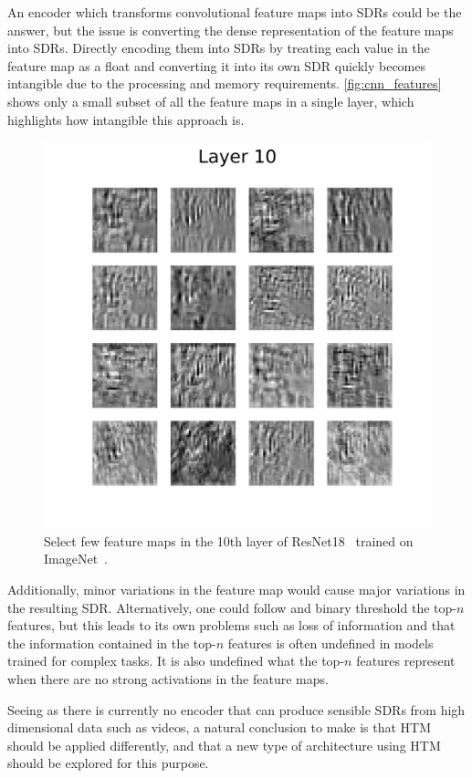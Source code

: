 \par
An encoder which transforms convolutional feature maps into SDRs could be the answer, but the issue is converting the dense representation of the feature maps into SDRs. Directly encoding them into SDRs by treating each value in the feature map as a float and converting it into its own SDR quickly becomes intangible due to the processing and memory requirements. \autoref{fig:cnn_features} shows only a small subset of all the feature maps in a single layer, which highlights how intangible this approach is.
\begin{figure}[H]
    \centering
    \includegraphics[width=0.5\linewidth]{resources/related_works/resnet18_layer_10.png}
    \caption[Feature Maps]{Select few feature maps in the 10th layer of ResNet18~\cite{resnet} trained on ImageNet~\cite{imagenet}.}
    \label{fig:cnn_features}
\end{figure}
\par
Additionally, minor variations in the feature map would cause major variations in the resulting SDR. Alternatively, one could follow \textcite{CNN_HTM} and binary threshold the top-$n$ features, but this leads to its own problems such as loss of information and that the information contained in the top-$n$ features is often undefined in models trained for complex tasks. It is also undefined what the top-$n$ features represent when there are no strong activations in the feature maps.
\par
Seeing as there is currently no encoder that can produce sensible SDRs from high dimensional data such as videos, a natural conclusion to make is that HTM should be applied differently, and that a new type of architecture using HTM should be explored for this purpose.
